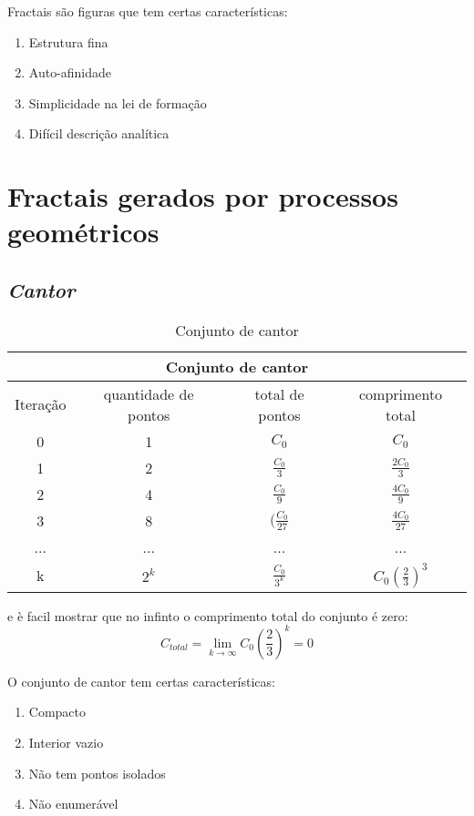 \documentclass[12pt]{report}
\theoremstyle{definition}
\begin{document}
Fractais são figuras que tem certas características:
\begin{enumerate}

\item Estrutura fina
\item Auto-afinidade
\item Simplicidade na lei de formação
\item Difícil descrição analítica
    
\end{enumerate}


\chapter{Fractais gerados por processos geométricos}
\section{\textit{Cantor}}

{\renewcommand{\arraystretch}{1.5}
\begin{table}[h]
    \centering
        \begin{tabular}{| c | c | c | c |}
             \multicolumn{4}{c}{Conjunto de cantor} \\
             \hline
             Iteração & quantidade de pontos & total de pontos & comprimento total\\
             \hline
             0 & 1 & $ C_0 $  & $ C_0 $ \\
             \hline
             1 & 2 & $ \frac{ C_0 }{3} $ & $\frac{ 2C_{0} }{ 3 }$ \\
             \hline
             2 & 4 & $ \frac{ C_{0} }{9} $ & $\frac{ 4C_0}{9}$ \\
             \hline 
             3 & 8 & $( \frac{ C_{0} }{27} $ & $\frac{ 4C_0}{27}$ \\
             \hline
             ... & ... & ... & ... \\
             \hline
             k & $2^k$ & $ \frac{ C_{0} }{3^k} $ & $ C_0(\frac{2}{3})^3 $ \\
             \hline
        \end{tabular}
    \caption{Conjunto de cantor}
    \label{tab:cantor}
\end{table}}


e è facil mostrar que no infinto o comprimento total do conjunto é zero:
\[ C_{total} = \displaystyle \lim_{k\to\infty} C_0\left( \frac{2}{3} \right)^k = 0 \]


O conjunto de cantor tem certas características:
\begin{enumerate}

\item Compacto
\item Interior vazio
\item Não tem pontos isolados
\item Não enumerável
    
\end{enumerate}
\end{document}
